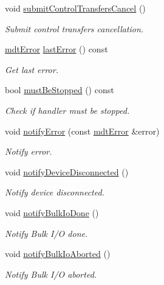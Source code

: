 \begin{DoxyCompactItemize}
void \hyperlink{classmdt_usbtmc_transfer_handler_a902d37d0866ff5165d3b17f4257c8efd}{submit\-Control\-Transfers\-Cancel} ()
\begin{DoxyCompactList}\small\item\em Submit control transfers cancellation. \end{DoxyCompactList}\item 
\hyperlink{classmdt_error}{mdt\-Error} \hyperlink{classmdt_usbtmc_transfer_handler_aa89e3f0c2f44611fc82b9dd59dabd266}{last\-Error} () const 
\begin{DoxyCompactList}\small\item\em Get last error. \end{DoxyCompactList}\item 
bool \hyperlink{classmdt_usbtmc_transfer_handler_ae2413dcf8b609a0d306f29f30510f053}{must\-Be\-Stopped} () const 
\begin{DoxyCompactList}\small\item\em Check if handler must be stopped. \end{DoxyCompactList}\item 
void \hyperlink{classmdt_usbtmc_transfer_handler_abd9c56a78fd329118221ee513075c6c2}{notify\-Error} (const \hyperlink{classmdt_error}{mdt\-Error} \&error)
\begin{DoxyCompactList}\small\item\em Notify error. \end{DoxyCompactList}\item 
void \hyperlink{classmdt_usbtmc_transfer_handler_a05ec728c24b005456389ad52c98f6fdd}{notify\-Device\-Disconnected} ()
\begin{DoxyCompactList}\small\item\em Notify device disconnected. \end{DoxyCompactList}\item 
void \hyperlink{classmdt_usbtmc_transfer_handler_a1ebfb78e95382f276244622d77a96cf4}{notify\-Bulk\-Io\-Done} ()
\begin{DoxyCompactList}\small\item\em Notify Bulk I/\-O done. \end{DoxyCompactList}\item 
void \hyperlink{classmdt_usbtmc_transfer_handler_a5f5c63210c3f75e7367911cb433b0070}{notify\-Bulk\-Io\-Aborted} ()
\begin{DoxyCompactList}\small\item\em Notify Bulk I/\-O aborted. \end{DoxyCompactList}\item 

\end{DoxyCompactItemize}
